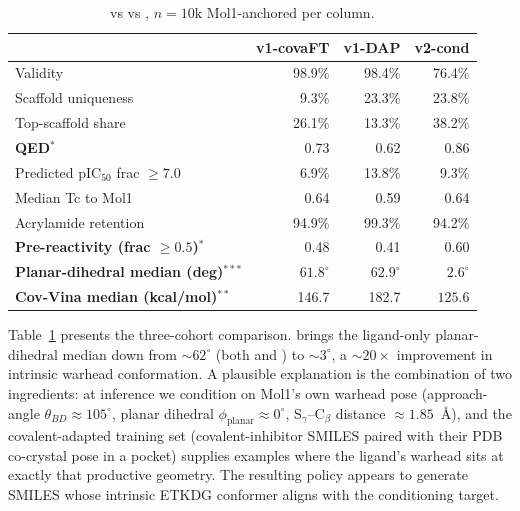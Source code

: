 \begin{table}[!t]
\centering
\caption{\Cvcovaft{} vs \Cvdap{} vs \Cvcond{}, $n{=}10\text{k}$ Mol1-anchored per column.}
\label{tab:m1a_geometry}
\small
\setlength{\tabcolsep}{6pt}
\renewcommand{\arraystretch}{1.15}
\begin{tabular}{lrrr}
\toprule
                                            & \textbf{v1-covaFT}   & \textbf{v1-DAP}   & \textbf{v2-cond}   \\
\midrule
Validity                                    & 98.9\%           & 98.4\%            & 76.4\%                 \\
Scaffold uniqueness                         & 9.3\%            & 23.3\%            & 23.8\%                 \\
Top-scaffold share                          & 26.1\%           & 13.3\%            & 38.2\%                 \\
\textbf{QED}$^{*}$                          & 0.73             & 0.62              & $\mathbf{0.86}$        \\
Predicted pIC$_{50}$ frac $\ge 7.0$         & 6.9\%            & 13.8\%            & 9.3\%                  \\
Median Tc to Mol1                           & 0.64             & 0.59              & 0.64                   \\
Acrylamide retention                         & 94.9\%           & 99.3\%            & 94.2\%                 \\
\textbf{Pre-reactivity (frac $\ge 0.5$)}$^{*}$ & 0.48             & 0.41              & $\mathbf{0.60}$        \\
\textbf{Planar-dihedral median (deg)}$^{***}$ & $61.8^\circ$     & $62.9^\circ$      & $\mathbf{2.6^\circ}$   \\
\textbf{Cov-Vina median (kcal/mol)}$^{**}$   & 146.7            & 182.7             & $\mathbf{125.6}$       \\
\bottomrule
\end{tabular}
\end{table}

Table~\ref{tab:m1a_geometry} presents the three-cohort comparison. \Cvcond{} brings the ligand-only planar-dihedral median down from $\sim 62^\circ$ (both \Cvcovaft{} and \Cvdap{}) to $\sim 3^\circ$, a $\sim 20\times$ improvement in intrinsic warhead conformation. A plausible explanation is the combination of two ingredients: at inference we condition on Mol1's own warhead pose (approach-angle $\theta_{BD}\!\approx\!105^\circ$, planar dihedral $\phi_{\text{planar}}\!\approx\!0^\circ$, S$_\gamma$--C$_\beta$ distance $\approx 1.85$~\r{A}), and the covalent-adapted training set (covalent-inhibitor SMILES paired with their PDB co-crystal pose in a pocket) supplies examples where the ligand's warhead sits at exactly that productive geometry. The resulting policy appears to generate SMILES whose intrinsic ETKDG conformer aligns with the conditioning target.

